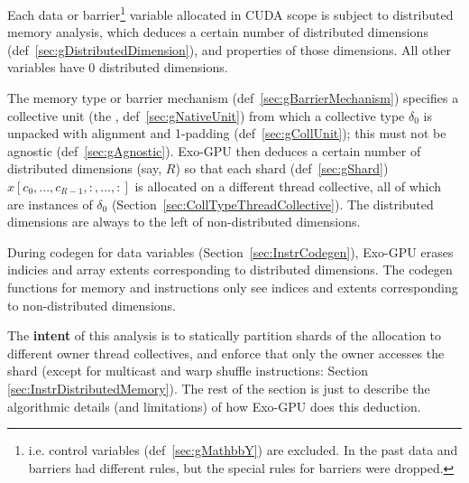 
Each data or barrier\footnote{i.e. control variables (def~\ref{sec:gMathbbY}) are excluded. In the past data and barriers had different rules, but the special rules for barriers were dropped.} variable allocated in CUDA scope is subject to distributed memory analysis, which deduces a certain number of distributed dimensions (def~\ref{sec:gDistributedDimension}), and properties of those dimensions.
All other variables have 0 distributed dimensions.

The memory type or barrier mechanism (def~\ref{sec:gBarrierMechanism}) specifies a collective unit (the , def~\ref{sec:gNativeUnit}) from which a collective type $\delta_0$ is unpacked with alignment and 1-padding (def~\ref{sec:gCollUnit}); this must not be agnostic (def~\ref{sec:gAgnostic}).
Exo-GPU then deduces a certain number of distributed dimensions (say, $R$) so that each shard (def~\ref{sec:gShard}) $x[c_0,...,c_{R-1},:,...,:]$ is allocated on a different thread collective, all of which are instances of $\delta_0$ (Section~\ref{sec:CollTypeThreadCollective}).
The distributed dimensions are always to the left of non-distributed dimensions.

During codegen for data variables (Section~\ref{sec:InstrCodegen}), Exo-GPU erases indicies and array extents corresponding to distributed dimensions.
The codegen functions for memory and instructions only see indices and extents corresponding to non-distributed dimensions.

The \textbf{intent} of this analysis is to statically partition shards of the allocation to different owner thread collectives, and enforce that only the owner accesses the shard (except for multicast and warp shuffle instructions: Section \ref{sec:InstrDistributedMemory}).
The rest of the section is just to describe the algorithmic details (and limitations) of how Exo-GPU does this deduction.






